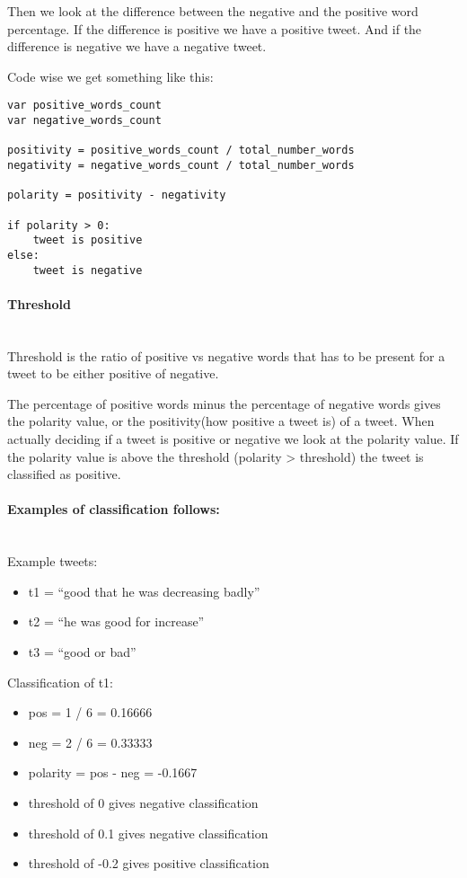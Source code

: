 Then we look at the difference between the negative and the positive word
percentage. If the difference is positive we have a positive tweet. And if the
difference is negative we have a negative tweet.

Code wise we get something like this: 
\begin{verbatim}
var positive_words_count
var negative_words_count

positivity = positive_words_count / total_number_words
negativity = negative_words_count / total_number_words

polarity = positivity - negativity

if polarity > 0: 
    tweet is positive
else: 
    tweet is negative
\end{verbatim}

\paragraph{Threshold} 
\hspace{0pt}\\ 
Threshold is the ratio of positive vs negative words that has to be present for a
tweet to be either positive of negative.

The percentage of positive words minus the percentage of negative words gives
the polarity value, or the positivity(how positive a tweet is) of a tweet. 
When actually deciding if a tweet is positive or negative we look at the
polarity value. If the polarity value is above the threshold (polarity >
threshold) the tweet is classified as positive. 

\paragraph{Examples of classification follows:} 
\hspace{0pt}\\ 
Example tweets:
\begin{itemize}
    \item t1 = “good that he was decreasing badly”
    \item t2 = “he was good for increase” 
    \item t3 = “good or bad”
\end{itemize}

Classification of t1:
\begin{itemize}
    \item pos = 1 / 6 = 0.16666
    \item neg = 2 / 6 = 0.33333
    \item polarity = pos - neg = -0.1667
    \item threshold of 0 gives negative classification
    \item threshold of 0.1 gives negative classification
    \item threshold of -0.2 gives positive classification
\end{itemize}

